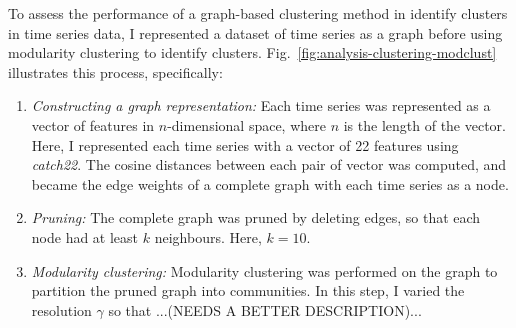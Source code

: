 To assess the performance of a graph-based clustering method in identify clusters in time series data, I represented a dataset of time series as a graph before using modularity clustering to identify clusters.
Fig.\ \ref{fig:analysis-clustering-modclust} illustrates this process, specifically:
\begin{enumerate}
  \item \emph{Constructing a graph representation:}
        Each time series was represented as a vector of features in $n$-dimensional space, where $n$ is the length of the vector.
        Here, I represented each time series with a vector of 22 features using \textit{catch22}.
        The cosine distances between each pair of vector was computed, and became the edge weights of a complete graph with each time series as a node.
  \item \emph{Pruning:}
        The complete graph was pruned by deleting edges, so that each node had at least $k$ neighbours.
        Here, $k=10$.
  \item \emph{Modularity clustering:}
        Modularity clustering was performed on the graph to partition the pruned graph into communities.
        In this step, I varied the resolution $\gamma$ so that ...(NEEDS A BETTER DESCRIPTION)...
\end{enumerate}


